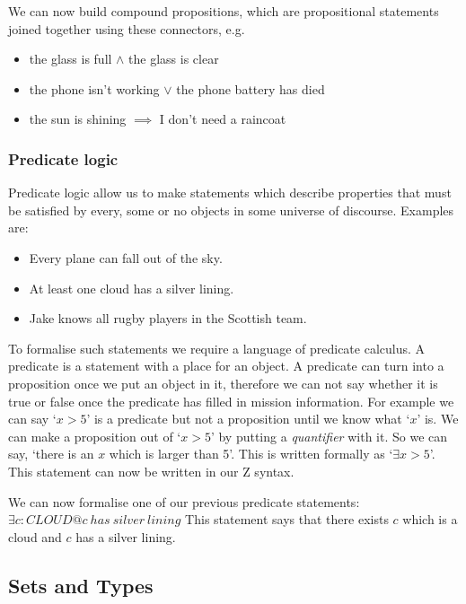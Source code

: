 We can now build compound propositions, which are propositional statements joined together using these connectors, e.g.

\begin{itemize}
\item the glass is full $\land$ the glass is clear

\item the phone isn't working $\lor$ the phone battery has died

\item the sun is shining $\implies$ I don't need a raincoat
\end{itemize}

\subsubsection{Predicate logic}

Predicate logic allow us to make statements which describe properties that must be satisfied by every, some or no objects in some universe of discourse. Examples are:

\begin{itemize}
\item Every plane can fall out of the sky.

\item At least one cloud has a silver lining.

\item Jake knows all rugby players in the Scottish team.
\end{itemize}

To formalise such statements we require a language of predicate calculus. A predicate is a statement with a place for an object. A predicate can turn into a proposition once we put an object in it, therefore we can not say whether it is true or false once the predicate has filled in mission information. For example we can say `$x > 5$' is a predicate but not a proposition until we know what `$x$' is. We can make a proposition out of `$x > 5$' by putting a \textit{quantifier} with it. So we can say, `there is an $x$ which is larger than 5'. This is written formally as `$\exists x > 5$'. This statement can now be written in our Z syntax.

We can now formalise one of our previous predicate statements:
\newline
$\exists c: CLOUD @ c\ has\ silver\ lining$
This statement says that there exists $c$ which is a cloud and $c$ has a silver lining.

\subsection{Sets and Types}

